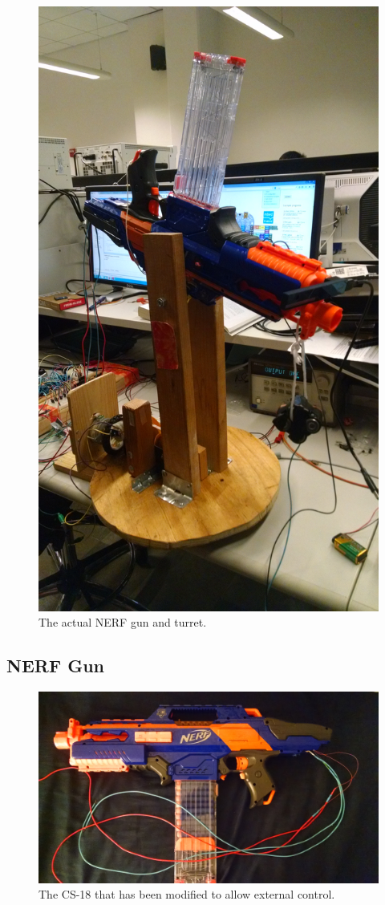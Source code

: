 \documentclass[journal]{IEEEtran}
\begin{document}
\begin{figure}[htbp]
    \centering
    \includegraphics[width=0.60\linewidth]{fullturret.jpg}
    \caption{The actual NERF gun and turret.}
    \label{fig:fullturret}
\end{figure}

\subsection{NERF Gun}

\begin{figure}[htbp]
    \centering
    \includegraphics[width=0.80\linewidth]{gun.jpg}
    \caption{The CS-18 that has been modified to allow external control.}
    \label{fig:gun}
\end{figure}
\end{document}
